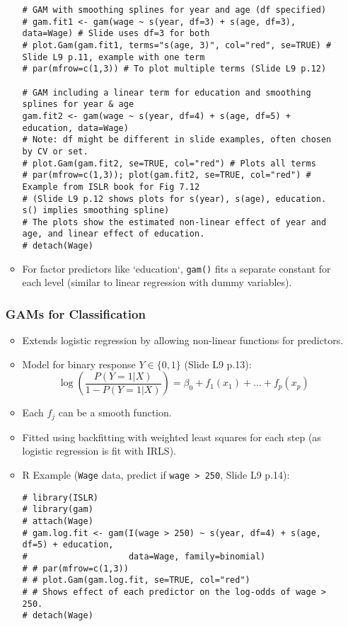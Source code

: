 \documentclass[12pt,a4paper]{article}
\newcommand{\Rfunction}[1]{\texttt{#1()}} %
\newcommand{\Robject}[1]{\texttt{#1}} %
\newcommand{\Rcode}[1]{\texttt{#1}} %
\begin{document}
\begin{itemize}
\begin{itemize}
\begin{lstlisting}[caption={GAM for Regression with Wage Data (Slide L9 p.11-12)}]
# GAM with smoothing splines for year and age (df specified)
# gam.fit1 <- gam(wage ~ s(year, df=3) + s(age, df=3), data=Wage) # Slide uses df=3 for both
# plot.Gam(gam.fit1, terms="s(age, 3)", col="red", se=TRUE) # Slide L9 p.11, example with one term
# par(mfrow=c(1,3)) # To plot multiple terms (Slide L9 p.12)

# GAM including a linear term for education and smoothing splines for year & age
gam.fit2 <- gam(wage ~ s(year, df=4) + s(age, df=5) + education, data=Wage)
# Note: df might be different in slide examples, often chosen by CV or set.
# plot.Gam(gam.fit2, se=TRUE, col="red") # Plots all terms
# par(mfrow=c(1,3)); plot(gam.fit2, se=TRUE, col="red") # Example from ISLR book for Fig 7.12
# (Slide L9 p.12 shows plots for s(year), s(age), education. s() implies smoothing spline)
# The plots show the estimated non-linear effect of year and age, and linear effect of education.
# detach(Wage)
\end{lstlisting}
            \item For factor predictors like `education`, \Rfunction{gam} fits a separate constant for each level (similar to linear regression with dummy variables).
        \end{itemize}

    \subsubsection{GAMs for Classification}
        \begin{itemize}
            \item Extends logistic regression by allowing non-linear functions for predictors.
            \item Model for binary response $Y \in \{0,1\}$ (Slide L9 p.13):
                $$ \log\left(\frac{P(Y=1|X)}{1-P(Y=1|X)}\right) = \beta_0 + f_1(x_1) + \dots + f_p(x_p) $$
            \item Each $f_j$ can be a smooth function.
            \item Fitted using backfitting with weighted least squares for each step (as logistic regression is fit with IRLS).
            \item R Example (\Robject{Wage} data, predict if \Rcode{wage > 250}, Slide L9 p.14):
\begin{lstlisting}[caption={GAM for Classification (Slide L9 p.14)}]
# library(ISLR)
# library(gam)
# attach(Wage)
# gam.log.fit <- gam(I(wage > 250) ~ s(year, df=4) + s(age, df=5) + education,
#                    data=Wage, family=binomial)
# # par(mfrow=c(1,3))
# # plot.Gam(gam.log.fit, se=TRUE, col="red")
# # Shows effect of each predictor on the log-odds of wage > 250.
# detach(Wage)
\end{lstlisting}
        \end{itemize}


\end{itemize}
\end{document}
